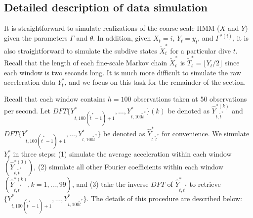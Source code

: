 
\subsection{Detailed description of data simulation}

It is straightforward to simulate realizations of the coarse-scale HMM ($X$ and $Y$) given the parameters $\Gamma$ and $\theta$. In addition, given $X_t = i$, $Y_t = y_t$, and $\Gamma^{*(i)}$, it is also straightforward to simulate the subdive states $\tilde{X}^*_t$ for a particular dive $t$. Recall that the length of each fine-scale Markov chain $\tilde{X}^*_t$ is $\tilde T^*_t = \lfloor Y_t/2 \rfloor$ since each window is two seconds long. It is much more difficult to simulate the raw acceleration data $Y_t^*$, and we focus on this task for the remainder of the section. 

Recall that each window contains $h = 100$ observations taken at 50 observations per second. Let $DFT\{Y^*_{t,100(\tilde t^* - 1) + 1},\ldots,Y^*_{t,100\tilde t^*}\}(k)$ be denoted as $\hat{Y}^{*(k)}_{t,\tilde t^*}$ and $DFT\{Y^*_{t,100(\tilde t^* - 1) + 1},\ldots,Y^*_{t,100\tilde t^*}\}$ be denoted as $\hat{Y}^*_{t,\tilde t^*}$ for convenience. We simulate $Y_t^*$ in three steps: (1) simulate the average acceleration within each window $\left(\hat Y^{*(0)}_{t,\tilde t^*}\right)$, (2) simulate all other Fourier coefficients within each window $\left(\hat Y^{*(k)}_{t,\tilde t^*}, k = 1,\ldots,99\right)$, and (3) take the inverse $DFT$ of $\hat{Y}^*_{t,\tilde t^*}$ to retrieve $\{Y^*_{t,100(\tilde t^* - 1) + 1},\ldots,Y^*_{t,100\tilde t^*}\}$. The details of this procedure are described below:

